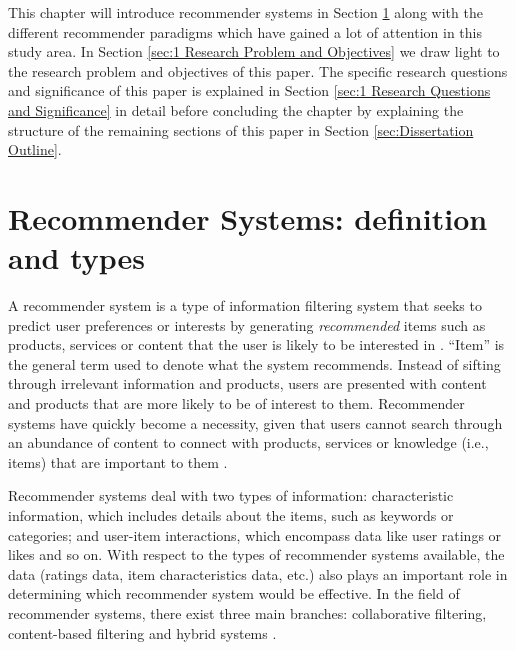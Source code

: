 This chapter will introduce recommender systems in Section \ref{sec:1 Recommender Systems: definition and types} along with the different recommender paradigms which have gained a lot of attention in this study area. In Section \ref{sec:1 Research Problem and Objectives} we draw light to the research problem and objectives of this paper. The specific research questions and significance of this paper is explained in Section \ref{sec:1 Research Questions and Significance} in detail before concluding the chapter by explaining the structure of the remaining sections of this paper in Section \ref{sec:Dissertation Outline}.


\section{Recommender Systems: definition and types}
\label{sec:1 Recommender Systems: definition and types}
A recommender system is a type of information filtering system that seeks to predict user preferences or interests by generating \textit{recommended} items such as products, services or content that the user is likely to be interested in \cite{seth2022comparative}. “Item” is the general term used to denote what the system recommends. Instead of sifting through irrelevant information and products, users are presented with content and products that are more likely to be of interest to them. Recommender systems have quickly become a necessity, given that users cannot search through an abundance of content to connect with products, services or knowledge (i.e., items) that are important to them \cite{seth2022comparative}. 

Recommender systems deal with two types of information: characteristic information, which includes details about the items, such as keywords or categories; and user-item interactions, which encompass data like user ratings or likes and so on.  With respect to the types of recommender systems available, the data (ratings data, item characteristics data, etc.) also plays an important role in determining which recommender system would be effective. In the field of recommender systems, there exist three main branches: collaborative filtering, content-based filtering and hybrid systems \cite{thorat2015survey}.

